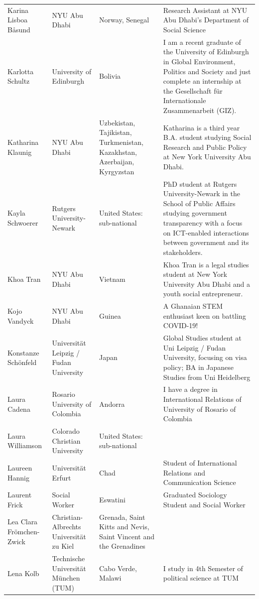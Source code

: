 \documentclass[]{article}
\begin{document}
\begin{longtable}{l>{\raggedright\arraybackslash}p{2cm}>{\raggedright\arraybackslash}p{2cm}>{\raggedright\arraybackslash}p{3cm}}
\rowcolor{gray!6}  Karina Lisboa Båsund & NYU Abu Dhabi & Norway, Senegal & Research Assistant at NYU Abu Dhabi's Department of Social Science\\
\addlinespace
Karlotta Schultz & University of Edinburgh & Bolivia & I am a recent graduate of the University of Edinburgh in Global Environment, Politics and Society and just complete an internship at the Gesellschaft für Internationale Zusammenarbeit (GIZ).\\
\rowcolor{gray!6}  Katharina Klaunig & NYU Abu Dhabi & Uzbekistan, Tajikistan, Turkmenistan, Kazakhstan, Azerbaijan, Kyrgyzstan & Katharina is a third year B.A. student studying Social Research and Public Policy at New York University Abu Dhabi.\\
Kayla Schwoerer & Rutgers University-Newark & United States: sub-national & PhD student at Rutgers University-Newark in the School of Public Affairs studying government transparency with a focus on ICT-enabled interactions between government and its stakeholders.\\
\rowcolor{gray!6}  Khoa Tran & NYU Abu Dhabi & Vietnam & Khoa Tran is a legal studies student at New York University Abu Dhabi and a youth social entrepreneur.\\
Kojo Vandyck & NYU Abu Dhabi & Guinea & A Ghanaian STEM enthusiast keen on battling COVID-19!\\
\addlinespace
\rowcolor{gray!6}  Konstanze Schönfeld & Universität Leipzig / Fudan University & Japan & Global Studies student at Uni Leipzig / Fudan University, focusing on visa policy; BA in Japanese Studies from Uni Heidelberg\\
Laura Cadena & Rosario University of Colombia & Andorra & I have a degree in International Relations of University of Rosario of Colombia\\
\rowcolor{gray!6}  Laura Williamson & Colorado Christian University & United States: sub-national & \\
Laureen Hannig & Universität Erfurt & Chad & Student of International Relations and Communication Science\\
\rowcolor{gray!6}  Laurent Frick & Social Worker & Eswatini & Graduated Sociology Student and Social Worker\\
\addlinespace
Lea Clara Frömchen-Zwick & Christian-Albrechts Universität zu Kiel & Grenada, Saint Kitts and Nevis, Saint Vincent and the Grenadines & \\
\rowcolor{gray!6}  Lena Kolb & Technische Universität München (TUM) & Cabo Verde, Malawi & I study in 4th Semester of political science at TUM\\

\end{longtable}
\end{document}
